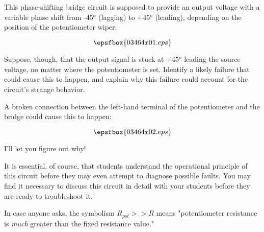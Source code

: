 

This phase-shifting bridge circuit is supposed to provide an output voltage with a variable phase shift from -45$^{o}$ (lagging) to +45$^{o}$ (leading), depending on the position of the potentiometer wiper:

$$\epsfbox{03464x01.eps}$$

Suppose, though, that the output signal is stuck at +45$^{o}$ leading the source voltage, no matter where the potentiometer is set.  Identify a likely failure that could cause this to happen, and explain why this failure could account for the circuit's strange behavior.







A broken connection between the left-hand terminal of the potentiometer and the bridge could cause this to happen:

$$\epsfbox{03464x02.eps}$$

I'll let you figure out why!







It is essential, of course, that students understand the operational principle of this circuit before they may even attempt to diagnose possible faults.  You may find it necessary to discuss this circuit in detail with your students before they are ready to troubleshoot it.

In case anyone asks, the symbolism $R_{pot} >> R$ means "potentiometer resistance is {\it much} greater than the fixed resistance value."




